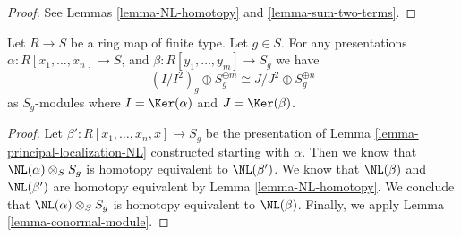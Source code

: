 \begin{proof}
See Lemmas \ref{lemma-NL-homotopy} and \ref{lemma-sum-two-terms}.
\end{proof}

\begin{lemma}
\label{lemma-conormal-module-localize}
Let $R \to S$ be a ring map of finite type.
Let $g \in S$. For any presentations
$\alpha : R[x_1, \ldots, x_n] \to S$, and
$\beta : R[y_1, \ldots, y_m] \to S_g$ we have
$$
(I/I^2)_g \oplus S^{\oplus m}_g \cong J/J^2 \oplus S_g^{\oplus n}
$$
as $S_g$-modules where
$I = \Ker(\alpha)$ and $J = \Ker(\beta)$.
\end{lemma}

\begin{proof}
Let $\beta' : R[x_1, \ldots, x_n, x] \to S_g$ be the
presentation of Lemma \ref{lemma-principal-localization-NL}
constructed starting with $\alpha$. Then we know that
$\NL(\alpha) \otimes_S S_g$ is homotopy equivalent to $\NL(\beta')$.
We know that $\NL(\beta)$ and $\NL(\beta')$ are homotopy equivalent
by Lemma \ref{lemma-NL-homotopy}. We conclude that
$\NL(\alpha) \otimes_S S_g$ is homotopy equivalent to $\NL(\beta)$.
Finally, we apply Lemma \ref{lemma-conormal-module}.
\end{proof}








